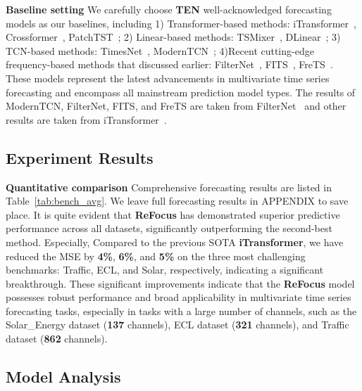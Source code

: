 \textbf{Baseline setting \quad} We carefully choose \textbf{TEN} well-acknowledged forecasting models as our baselines, including 1) Transformer-based methods: iTransformer~\citep{LiuiTransformer}, Crossformer~\citep{zhang2023crossformer}, PatchTST~\citep{Nie2022patchtst}; 2) Linear-based methods: TSMixer~\citep{chen2023tsmixer}, DLinear~\citep{zeng2023dlinear}; 3) TCN-based methods: TimesNet~\citep{wu2022timesnet}, ModernTCN~\citep{donghao2024moderntcn}; 4)Recent cutting-edge frequency-based methods that discussed earlier: FilterNet~\citep{yi2024filternet}, FITS~\citep{xu2024fits}, FreTS~\citep{yi2023fremlp}. These models represent the latest advancements in multivariate time series forecasting and encompass all mainstream prediction model types. The results of ModernTCN, FilterNet, FITS, and FreTS are taken from FilterNet~\citep{yi2024filternet} and other results are taken from iTransformer~\citep{LiuiTransformer}.


\subsection{Experiment Results}

\textbf{Quantitative comparison \quad} Comprehensive forecasting results are listed in Table~\ref{tab:bench_avg}. We leave full forecasting results in APPENDIX to save place. It is quite evident that \textbf{ReFocus} has demonstrated superior predictive performance across all datasets, significantly outperforming the second-best method.  Especially, Compared to the previous SOTA \textbf{iTransformer}, we have reduced the MSE by \textbf{4\%}, \textbf{6\%}, and \textbf{5\%} on the three most challenging benchmarks: Traffic, ECL, and Solar, respectively, indicating a significant breakthrough. These significant improvements indicate that the \textbf{ReFocus} model possesses robust performance and broad applicability in multivariate time series forecasting tasks, especially in tasks with a large number of channels, such as the Solar\_Energy dataset (\textbf{137} channels), ECL dataset (\textbf{321} channels), and Traffic dataset (\textbf{862} channels).

\subsection{Model Analysis}








